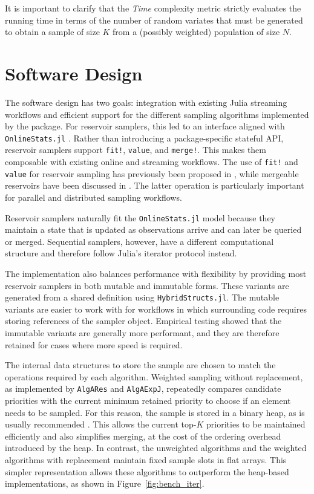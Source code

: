 \documentclass{juliacon}
\begin{document}
It is important to clarify that the \textit{Time} complexity metric strictly evaluates the running time in terms of the number of random variates that must be generated to obtain a sample of size $K$ from a (possibly weighted) population of size $N$.

\section{Software Design}

The software design has two goals: integration with existing Julia streaming workflows and efficient support for the different sampling algorithms implemented by the package. For reservoir samplers, this led to an interface aligned with \texttt{OnlineStats.jl} \cite{day2020onlinestats}. Rather than introducing a package-specific stateful API, reservoir samplers support \texttt{fit!}, \texttt{value}, and \texttt{merge!}. This makes them composable with existing online and streaming workflows. The use of \texttt{fit!} and \texttt{value} for reservoir sampling has previously been proposed in \cite{efraimidis2015weighted}, while mergeable reservoirs have been discussed in \cite{cormode2011}. The latter operation is particularly important for parallel and distributed sampling workflows.

Reservoir samplers naturally fit the \texttt{OnlineStats.jl} model because they maintain a state that is updated as observations arrive and can later be queried or merged. Sequential samplers, however, have a different computational structure and therefore follow Julia's iterator protocol instead.

The implementation also balances performance with flexibility by providing most reservoir samplers in both mutable and immutable forms. These variants are generated from a shared definition using \texttt{HybridStructs.jl}. The mutable variants are easier to work with for workflows in which surrounding code requires storing references of the sampler object. Empirical testing showed that the immutable variants are generally more performant, and they are therefore retained for cases where more speed is required.

The internal data structures to store the sample are chosen to match the operations required by each algorithm. Weighted sampling without replacement, as implemented by \texttt{AlgARes} and \texttt{AlgAExpJ}, repeatedly compares candidate priorities with the current minimum retained priority to choose if an element needs to be sampled. For this reason, the sample is stored in a binary heap, as is usually recommended \cite{efraimidis2006weighted, efraimidis2015weighted}. This allows the current top-$K$ priorities to be maintained efficiently and also simplifies merging, at the cost of the ordering overhead introduced by the heap. In contrast, the unweighted algorithms and the weighted algorithms with replacement maintain fixed sample slots in flat arrays. This simpler representation allows these algorithms to outperform the heap-based implementations, as shown in Figure~\ref{fig:bench_iter}.
\end{document}
